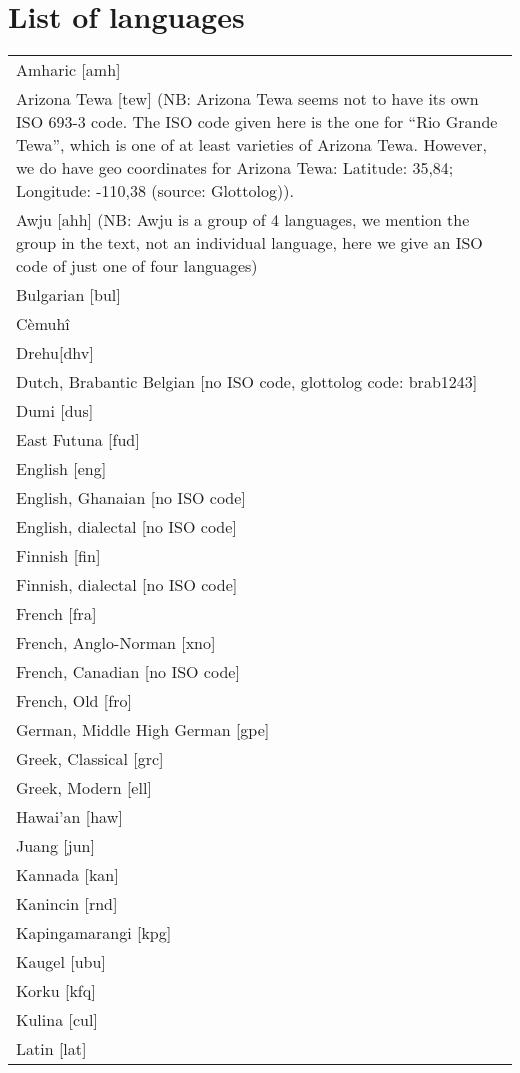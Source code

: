 ﻿\documentclass[output=paper]{langsci/langscibook}
\begin{document}
\section*{List of languages}
\setlength\LTleft{0pt}
\setlength\LTright{0pt}
\begin{longtable}{@{} p{\textwidth} @{}}
Amharic [amh]\\
Arizona Tewa [tew] (NB: Arizona Tewa seems not to have its own ISO 693-3
code. The ISO code given here is the one for ``Rio Grande Tewa'', which is
one of at least varieties of Arizona Tewa. However, we do have geo
coordinates for Arizona Tewa: Latitude: 35,84; Longitude: -110,38 (source:
Glottolog)).\\
Awju [ahh] (NB: Awju is a group of 4 languages, we mention the group in the
text, not an individual language, here we give an ISO code of just one of
four languages)\\
Bulgarian [bul]\\
Cèmuhî\\
Drehu[dhv]\\
Dutch, Brabantic Belgian [no ISO code, glottolog code: brab1243]\\
Dumi [dus]\\
East Futuna [fud]\\
English [eng]\\
English, Ghanaian [no ISO code]\\
English, dialectal [no ISO code]\\
Finnish [fin]\\
Finnish, dialectal [no ISO code]\\
French [fra]\\
French, Anglo-Norman [xno]\\
French, Canadian [no ISO code]\\
French, Old [fro]\\
German, Middle High German [gpe]\\
Greek, Classical [grc]\\
Greek, Modern [ell]\\
Hawai'an [haw]\\
Juang [jun]\\
Kannada [kan]\\
Kanincin [rnd]\\
Kapingamarangi [kpg]\\
Kaugel [ubu]\\
Korku [kfq]\\
Kulina [cul]\\
Latin [lat]\\

\end{longtable}
\end{document}
